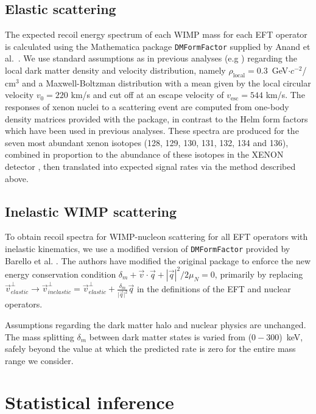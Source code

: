\subsection{Elastic scattering}
\label{subsubsec:Elastic}

The expected recoil energy spectrum of each WIMP mass for each EFT operator is calculated using the Mathematica package \texttt{DMFormFactor} supplied by Anand et al.~\cite{Fitzpatrick:MathTools,Anand:MathTools}. We use standard assumptions as in previous analyses (e.g \cite{xe100_run_combination}) regarding the local dark matter density and velocity distribution, namely $\rho_\mathrm{local} = 0.3$~GeV$\cdot c^{-2}$/$\mathrm{cm}^{3}$ and a Maxwell-Boltzman distribution with a mean given by the local circular velocity $v_0 = 220$ km/s and cut off at an escape velocity of $v_\mathrm{esc} = 544$ km/s. The responses of xenon nuclei to a scattering event are computed from one-body density matrices provided with the package, in contrast to the Helm form factors which have been used in previous analyses. These spectra are produced for the seven most abundant xenon isotopes (128, 129, 130, 131, 132, 134 and 136), combined in proportion to the abundance of these isotopes in the XENON detector \cite{xe100_run10_sd}, then translated into expected signal rates via the method described above.

\subsection{Inelastic WIMP scattering}
\label{subsubsec:Inelastic}
To obtain recoil spectra for WIMP-nucleon scattering for all EFT operators with inelastic kinematics, we use a modified version of \texttt{DMFormFactor} provided by Barello et al. \cite{InelasticMath}. The authors have modified the original package to enforce the new energy conservation condition $\delta_m + \vec{v}\cdot\vec{q} + \left|\vec{q}\right|^2/2\mu_N = 0$, primarily by replacing 
$\vec{v}^\perp_{elastic} \rightarrow \vec{v}^\perp_{inelastic} = \vec{v}^\perp_{elastic} +\frac{\delta_m}{\vert{\vec{q}}\vert^2}\vec{q}$ in the definitions of the EFT and nuclear operators. 

Assumptions regarding the dark matter halo and nuclear physics are unchanged. The mass splitting $\delta_m$ between dark matter states is varied from ($0-300$)~keV, safely beyond the value at which the predicted rate is zero for the entire mass range we consider.

\section{Statistical inference}
\label{sec:LikelihoodFunction}

